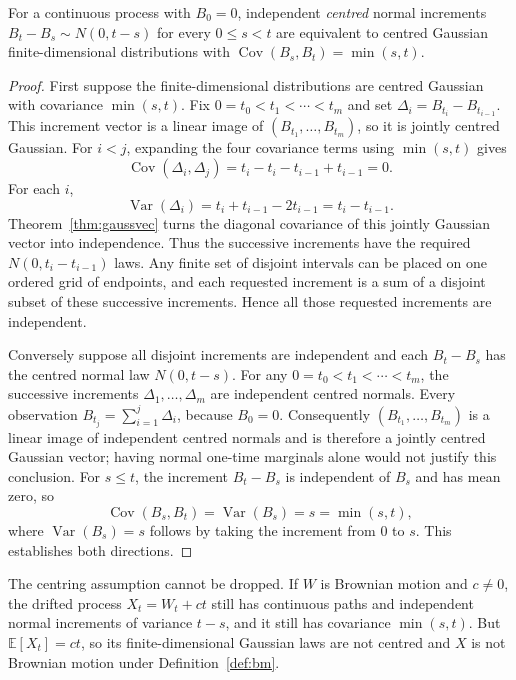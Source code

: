 \begin{proposition}[covariance]\label{prop:bmgauss}
For a continuous process with $B_0=0$, independent \emph{centred} normal increments $B_t-B_s\sim N(0,t-s)$ for every $0\le s<t$ are equivalent to centred Gaussian finite-dimensional distributions with $\operatorname{Cov}(B_s,B_t)=\min(s,t)$.
\end{proposition}
\begin{proof}
First suppose the finite-dimensional distributions are centred Gaussian with covariance $\min(s,t)$. Fix $0=t_0<t_1<\cdots<t_m$ and set $\Delta_i=B_{t_i}-B_{t_{i-1}}$. This increment vector is a linear image of $(B_{t_1},\ldots,B_{t_m})$, so it is jointly centred Gaussian. For $i<j$, expanding the four covariance terms using $\min(s,t)$ gives
\[
 \operatorname{Cov}(\Delta_i,\Delta_j)
 =t_i-t_i-t_{i-1}+t_{i-1}=0.
\]
For each $i$,
\[
 \operatorname{Var}(\Delta_i)=t_i+t_{i-1}-2t_{i-1}=t_i-t_{i-1}.
\]
Theorem~\ref{thm:gaussvec} turns the diagonal covariance of this jointly Gaussian vector into independence. Thus the successive increments have the required $N(0,t_i-t_{i-1})$ laws. Any finite set of disjoint intervals can be placed on one ordered grid of endpoints, and each requested increment is a sum of a disjoint subset of these successive increments. Hence all those requested increments are independent.

Conversely suppose all disjoint increments are independent and each $B_t-B_s$ has the centred normal law $N(0,t-s)$. For any $0=t_0<t_1<\cdots<t_m$, the successive increments $\Delta_1,\ldots,\Delta_m$ are independent centred normals. Every observation $B_{t_j}=\sum_{i=1}^j\Delta_i$, because $B_0=0$. Consequently $(B_{t_1},\ldots,B_{t_m})$ is a linear image of independent centred normals and is therefore a jointly centred Gaussian vector; having normal one-time marginals alone would not justify this conclusion. For $s\le t$, the increment $B_t-B_s$ is independent of $B_s$ and has mean zero, so
\[
 \operatorname{Cov}(B_s,B_t)=\operatorname{Var}(B_s)=s=\min(s,t),
\]
where $\operatorname{Var}(B_s)=s$ follows by taking the increment from $0$ to $s$. This establishes both directions.
\end{proof}

The centring assumption cannot be dropped. If $W$ is Brownian motion and $c\ne0$, the drifted process $X_t=W_t+ct$ still has continuous paths and independent normal increments of variance $t-s$, and it still has covariance $\min(s,t)$. But $\mathbb E[X_t]=ct$, so its finite-dimensional Gaussian laws are not centred and $X$ is not Brownian motion under Definition~\ref{def:bm}.

